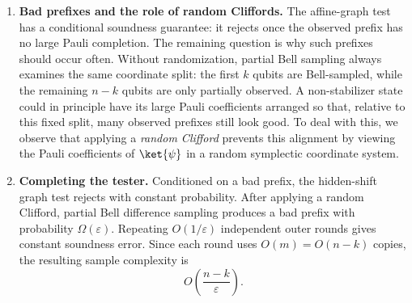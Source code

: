 \documentclass[11pt]{article}
\newcommand{\F}{\mathbb{F}}
\begin{document}
\begin{enumerate}
This Fourier sampling step can be realized with \emph{single-copy measurements}\footnote{We will give two realizations: one directly inspired by standard Fourier sampling that uses $m+1$ ancilla qubits (which are not coherent between rounds) and another ancilla-free implementation that only requires Clifford gates and measurements.} and returns linear~constraints involving $t^*$. Up to some technicalities with phases, sampling a stabilizer state~returns 
\begin{align}
    (s_1, b_1), \ldots, (s_N,b_N) \in \F_2^m \times \F_2\ ,
\end{align}
where $b_i = t^*\cdot s_i \oplus \text{sign}(\lambda)$. In particular, the data lies entirely in the graph of the affine function $s\mapsto t^*\cdot s \oplus \text{sign}(\lambda)$. But, if $\ket{\psi}$ is not a stabilizer state then no such $t^*$ need exist and, if not, then the samples do not lie in the graph of an affine function with high probability. Hence, the tester obtains $O(m)$ samples and checks for affine consistency.

\item \textbf{Bad prefixes and the role of random Cliffords.}
The affine-graph test has a conditional soundness guarantee: it rejects once the observed prefix has no large Pauli completion.  The remaining question is why such prefixes should occur often.  Without randomization, partial Bell sampling always examines the same coordinate split: the first $k$ qubits are
Bell-sampled, while the remaining $n-k$ qubits are only partially observed.  A non-stabilizer state could in principle have its large Pauli coefficients arranged so that, relative to this fixed split, many observed prefixes still look good. To deal with this, we observe that applying a \emph{random Clifford} prevents this alignment by viewing the Pauli coefficients of $\ket{\psi}$ in a random symplectic coordinate system. 
\item \textbf{Completing the tester.}
Conditioned on a bad prefix, the hidden-shift graph test rejects with constant
probability. After applying a random Clifford, partial Bell difference sampling produces a bad prefix with probability
$\Omega(\varepsilon)$.  Repeating $O(1/\varepsilon)$ independent outer rounds gives
constant soundness error.  Since each round uses $O(m)=O(n-k)$ copies, the
resulting sample complexity is
$$
    O\!\left(\frac{n-k}{\varepsilon}\right).
$$
\end{enumerate}
\end{document}

